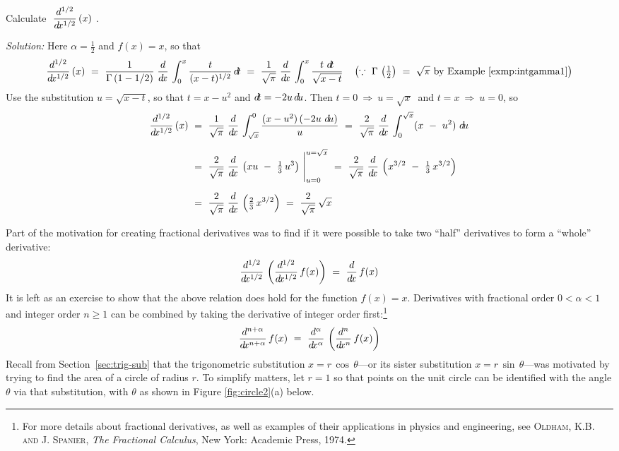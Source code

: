 \begin{exmp}\label{exmp:halfderivx}
\noindent Calculate $~\dfrac{d^{1/2}}{d\!x^{1/2}}\,(x)~$.\vspace{1mm}
\par\noindent\emph{Solution:} Here $\alpha = \frac{1}{2}$ and $f(x)=x$, so that
\[
\frac{d^{1/2}}{d\!x^{1/2}}\,(x) ~=~ 
\frac{1}{\Gamma\,(1-1/2)}\;\frac{d}{d\!x}\,\int_0^x \frac{t}{(x-t)^{1/2}}\,d\!t ~=~
\frac{1}{\sqrt{\pi}}\;\frac{d}{d\!x}\,\int_0^x \frac{t~d\!t}{\sqrt{x-t}}
\quad\left(\because~\Gamma\,\left(\tfrac{1}{2}\right) ~=~ \sqrt{\pi}
~\text{by Example \ref{exmp:intgamma1}}\right)
\]
Use the substitution $u=\sqrt{x-t}$,
so that $t=x-u^2$ and $d\!t=-2u\,d\!u$. Then $t=0~\Rightarrow~u=\sqrt{x}~$ and
$t=x~\Rightarrow~u=0$, so
\begin{align*}
\frac{d^{1/2}}{\dx^{1/2}}\,(x) ~&=~ 
\frac{1}{\sqrt{\pi}}\;\ddx\,\int_{\sqrt{x}}^0 \frac{(x-u^2)\,(-2u~\du)}{u}
~=~ \frac{2}{\sqrt{\pi}}\;\ddx\,\int_0^{\sqrt{x}} (x ~-~ u^2)~\du\\[6pt]
&=~ \frac{2}{\sqrt{\pi}}\;\ddx\,\left(xu ~-~ \tfrac{1}{3}\,u^3\right)~\Biggr|_{u=0}^{u=\sqrt{x}}
~=~ \frac{2}{\sqrt{\pi}}\;\ddx\,\left(x^{3/2} ~-~ \tfrac{1}{3}\,x^{3/2}\right)\\[6pt]
&=~ \frac{2}{\sqrt{\pi}}\;\ddx\,\left(\tfrac{2}{3}\,x^{3/2}\right)
~=~ \frac{2}{\sqrt{\pi}}\,\sqrt{x}
\end{align*}
\end{exmp}
\divider
\vspace{2mm}

\noindent Part of the motivation for creating fractional derivatives was to find
if it were possible to take two ``half'' derivatives to form a ``whole''
derivative:
\[
\frac{d^{1/2}}{d\!x^{1/2}}\,\left(\frac{d^{1/2}}{d\!x^{1/2}}\,f(x)\right) ~=~
\frac{d}{d\!x}\,f(x)
\]
It is left as an exercise to show that the above relation does hold for the
function $f(x) = x$. Derivatives with fractional order $0 < \alpha < 1$ and
integer order $n \ge 1$ can be combined by taking the derivative of integer
order first:\footnote{For more details about fractional derivatives, as well as
examples of their applications in physics and engineering, see
\textsc{Oldham, K.B. and J. Spanier}, \emph{The Fractional Calculus}, New York:
Academic Press, 1974.}
\[
\frac{d^{n+\alpha}}{d\!x^{n+\alpha}}\,f(x) ~=~
\frac{d^{\alpha}}{d\!x^{\alpha}}\,\left(\frac{d^{n}}{d\!x^{n}}\,f(x)\right)
\]
\newpage
Recall from Section~\ref{sec:trig-sub} that the trigonometric substitution
$x=r\,\cos\,\theta$---or its sister substitution $x=r\,\sin\,\theta$---was
motivated by trying to find the area of a circle of radius $r$. To simplify
matters, let $r=1$ so that points on the unit circle can be identified with the
angle $\theta$ via that substitution, with $\theta$ as shown in Figure
\ref{fig:circle2}(a) below.

